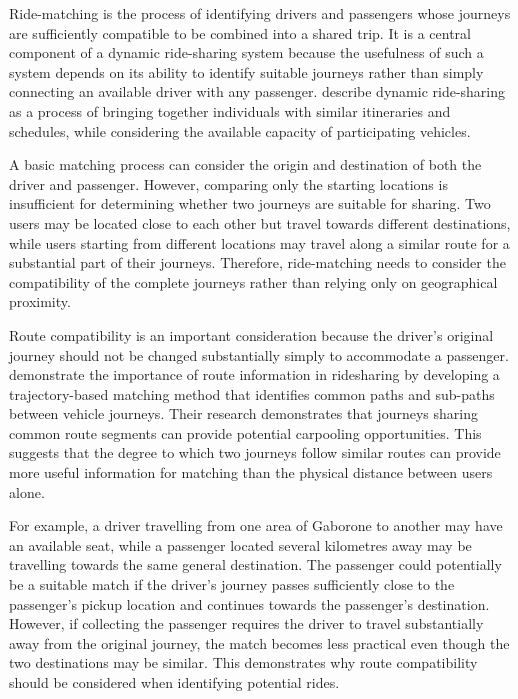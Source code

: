 Ride-matching is the process of identifying drivers and passengers whose journeys are sufficiently compatible to be combined into a shared trip. It is a central component of a dynamic ride-sharing system because the usefulness of such a system depends on its ability to identify suitable journeys rather than simply connecting an available driver with any passenger. \citet{agatz2012} describe dynamic ride-sharing as a process of bringing together individuals with similar itineraries and schedules, while considering the available capacity of participating vehicles.

A basic matching process can consider the origin and destination of both the driver and passenger. However, comparing only the starting locations is insufficient for determining whether two journeys are suitable for sharing. Two users may be located close to each other but travel towards different destinations, while users starting from different locations may travel along a similar route for a substantial part of their journeys. Therefore, ride-matching needs to consider the compatibility of the complete journeys rather than relying only on geographical proximity.

Route compatibility is an important consideration because the driver's original journey should not be changed substantially simply to accommodate a passenger. \citet{hong2017} demonstrate the importance of route information in ridesharing by developing a trajectory-based matching method that identifies common paths and sub-paths between vehicle journeys. Their research demonstrates that journeys sharing common route segments can provide potential carpooling opportunities. This suggests that the degree to which two journeys follow similar routes can provide more useful information for matching than the physical distance between users alone.

For example, a driver travelling from one area of Gaborone to another may have an available seat, while a passenger located several kilometres away may be travelling towards the same general destination. The passenger could potentially be a suitable match if the driver's journey passes sufficiently close to the passenger's pickup location and continues towards the passenger's destination. However, if collecting the passenger requires the driver to travel substantially away from the original journey, the match becomes less practical even though the two destinations may be similar. This demonstrates why route compatibility should be considered when identifying potential rides.

